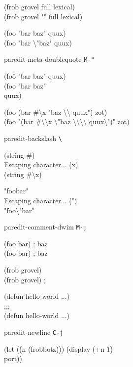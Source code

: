 \documentclass[landscape,a3paper]{article}
\newenvironment{nstabbing}
  {\setlength{\topsep}{-\parskip}%
   \setlength{\partopsep}{0.2em}%
   \tabbing}
  {\endtabbing}
\begin{document}
\begin{multicols}{4}
\ttfamily
(frob grovel \cursor full lexical)\\
(frob grovel "\cursor " full lexical)

(foo "bar \cursor baz" quux)\\
(foo "bar \textbackslash"\cursor baz" quux)
\rmfamily

paredit-meta-doublequote \texttt{M-"}

\ttfamily
\begin{nstabbing}
(foo\={} "bar \cursor baz" quux)\\
(foo "bar baz"\\
\>\cursor quux)
\end{nstabbing}

(foo \cursor(bar \#\textbackslash x "baz \textbackslash\textbackslash{} quux") zot)\\
(foo "\cursor(bar \#\textbackslash\textbackslash x \textbackslash"baz \textbackslash\textbackslash\textbackslash\textbackslash{} quux\textbackslash")" zot)
\rmfamily

paredit-backslash \texttt{\textbackslash}

\ttfamily
(string \#\cursor)\\
Escaping character... (x)\\
(string \#\textbackslash x\cursor)

"foo\cursor bar"\\
Escaping character... (")\\
"foo\textbackslash"\cursor bar"
\rmfamily

paredit-comment-dwim \texttt{M-;}

\ttfamily
\begin{nstabbing}
(foo \cursor bar) \space ; baz \space \space \space \space \=\\
(foo bar) \>; \cursor baz
\end{nstabbing}

\begin{nstabbing}
(frob grovel)\cursor \space \space \space \space \space \space \space \space\=\\
(frob grovel) \>;\cursor
\end{nstabbing}

\cursor(defun hello-world ...)\\
;;; \cursor\\
(defun hello-world ...)
\rmfamily

paredit-newline \texttt{C-j}

\ttfamily
\begin{nstabbing}
(let ((n (frobbotz))) \cursor (display (+n 1)\\
port))
\end{nstabbing}


\end{multicols}
\end{document}
